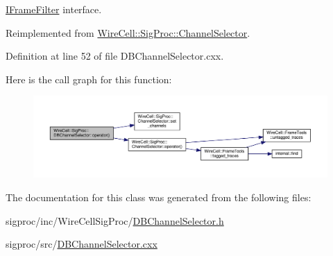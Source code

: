 \hyperlink{class_wire_cell_1_1_i_frame_filter}{I\+Frame\+Filter} interface. 



Reimplemented from \hyperlink{class_wire_cell_1_1_sig_proc_1_1_channel_selector_aaca59eb8b7d47e29fed24f6976adc4f3}{Wire\+Cell\+::\+Sig\+Proc\+::\+Channel\+Selector}.



Definition at line 52 of file D\+B\+Channel\+Selector.\+cxx.

Here is the call graph for this function\+:
\nopagebreak
\begin{figure}[H]
\begin{center}
\leavevmode
\includegraphics[width=350pt]{class_wire_cell_1_1_sig_proc_1_1_d_b_channel_selector_aed483bbdb14a86719f307749becf7695_cgraph}
\end{center}
\end{figure}


The documentation for this class was generated from the following files\+:\begin{DoxyCompactItemize}
\item 
sigproc/inc/\+Wire\+Cell\+Sig\+Proc/\hyperlink{_d_b_channel_selector_8h}{D\+B\+Channel\+Selector.\+h}\item 
sigproc/src/\hyperlink{_d_b_channel_selector_8cxx}{D\+B\+Channel\+Selector.\+cxx}\end{DoxyCompactItemize}
